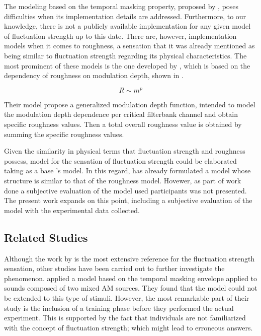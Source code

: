 \documentclass[../main.tex]{subfiles}
\begin{document}
\begin{theoreticalbackground}
The modeling based on the temporal masking property, proposed by
\citeauthor{Fastl2007Psychoacoustics}, poses difficulties when its
implementation details are addressed. Furthermore, to our knowledge, there is
not a publicly available implementation for any given model of fluctuation
strength up to this date. There are, however, implementation models when it
comes to roughness, a sensation that it was already mentioned as being similar
to fluctuation strength regarding its physical characteristics. The most
prominent of these models is the one developed by
\textcite{daniel1997psychoacoustical}, which is based on the dependency of
roughness on modulation depth, shown in .

\begin{equation}
  R \sim m^p
  \label{eq:R}
\end{equation}

Their model propose a generalized modulation depth function, intended to model
the modulation depth dependence per critical filterbank channel and obtain
specific roughness values. Then a total overall roughness value is obtained by
summing the specific roughness values.

Given the similarity in physical terms that fluctuation strength and roughness
possess,  model for the sensation of fluctuation strength could be elaborated
taking as a base \citeauthor{daniel1997psychoacoustical}'s model. In this
regard, \textcite{Sontacchi1998} has already formulated a model whose structure
is similar to that of the roughness model. Hovewer, as part of work done a
subjective evaluation of the model used participants was not presented. The
present work expands on this point, including a subjective evaluation of the
model with the experimental data collected.

\subsection{Related Studies}

Although the work by \citeauthor{Fastl2007Psychoacoustics} is the most extensive
reference for the fluctuation strength sensation, other studies have been
carried out to further investigate the phenomenon.
\textcite{Accolti2009Fluctuation} applied a model based on the temporal masking
envelope applied to sounds composed of two mixed \gls{AM} sources. They found
that the model could not be extended to this type of stimuli. However, the most
remarkable part of their study is the inclusion of a training phase before they
performed the actual experiment. This is supported by the fact that individuals
are not familiarized with the concept of fluctuation strength; which might lead
to erroneous answers.


\end{theoreticalbackground}
\end{document}
